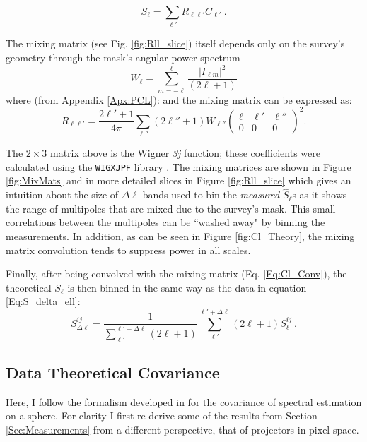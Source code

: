 \begin{equation}
S_{\ell} = \sum_{\ell'}R_{\ell \ell'} C_{\ell'} \ .
\label{Eq:Cl_Conv}
\end{equation}

\qquad The mixing matrix (see Fig. \ref{fig:Rll_slice}) itself depends only on the survey's geometry through the mask's angular power spectrum
\begin{equation}
W_{\ell} = \sum_{m=-\ell}^{\ell} \frac{|I_{\ell m}|^2}{(2\ell +1)}
\end{equation}
where (from Appendix \ref{Apx:PCL}):
and the mixing matrix can be expressed as:
\begin{equation}
R_{\ell \ell'} = \dfrac{2\ell' + 1}{4\pi}\sum_{\ell ''}(2\ell'' + 1)W_{\ell ''}\begin{pmatrix} \ell & \ell' & \ell'' \\ 0 & 0 & 0 \end{pmatrix}^2.
\label{Eq:MixMat}
\end{equation}

\noindent The $2 \times 3$ matrix above is the Wigner \textit{3j} function; these coefficients were calculated using the \texttt{WIGXJPF} library \citep{Wig3j}. The mixing matrices are shown in Figure \ref{fig:MixMats} and in more detailed slices in Figure \ref{fig:Rll_slice} which gives an intuition about the size of $\Delta\ell$-bands used to bin the \textit{measured} $\hat{S}_{\ell}$s as it shows the range of multipoles that are mixed due to the survey's mask. This small correlations between the multipoles can be ``washed away" by binning the measurements. In addition, as can be seen in Figure \ref{fig:Cl_Theory}, the mixing matrix convolution tends to suppress power in all scales.

\qquad Finally, after being convolved with the mixing matrix (Eq. \eqref{Eq:Cl_Conv}), the theoretical $S_{\ell}$ is then binned in the same way as the data in equation \eqref{Eq:S_delta_ell}:
\begin{equation}S_{\Delta\ell}^{ij} = \frac{1}{\sum_{\ell'}^{\ell'+\Delta\ell}(2\ell+1)}\sum_{\ell'}^{\ell'+\Delta\ell}(2\ell+1)S_{\ell}^{ij}  \ .
\label{Eq:S_delta_ell2}
\end{equation}

\subsection{Data Theoretical Covariance}\label{Sec:TheoCov}
Here, I follow the formalism developed in \cite{2008DahlenSimons} for the covariance of spectral estimation on a sphere. For clarity I first re-derive some of the results from Section \ref{Sec:Measurements} from a different perspective, that of projectors in pixel space. 

